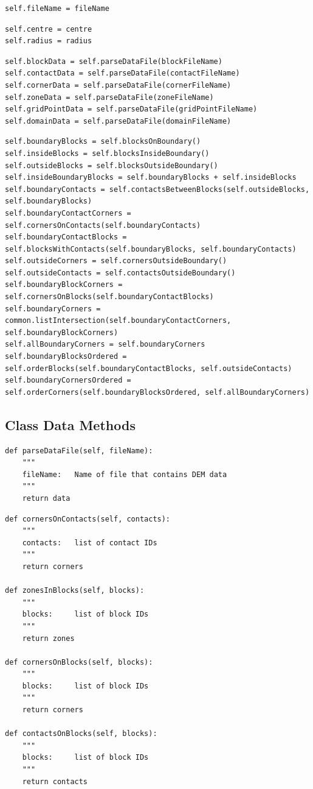 \begin{lstlisting}[frame=single] 
self.fileName = fileName
\end{lstlisting}


\begin{lstlisting}[frame=single] 
self.centre = centre
self.radius = radius
\end{lstlisting}


\begin{lstlisting}[frame=single] 
self.blockData = self.parseDataFile(blockFileName)
self.contactData = self.parseDataFile(contactFileName)
self.cornerData = self.parseDataFile(cornerFileName)
self.zoneData = self.parseDataFile(zoneFileName)
self.gridPointData = self.parseDataFile(gridPointFileName)
self.domainData = self.parseDataFile(domainFileName)
\end{lstlisting}


\begin{lstlisting}[frame=single] 
self.boundaryBlocks = self.blocksOnBoundary()
self.insideBlocks = self.blocksInsideBoundary()
self.outsideBlocks = self.blocksOutsideBoundary()
self.insideBoundaryBlocks = self.boundaryBlocks + self.insideBlocks
self.boundaryContacts = self.contactsBetweenBlocks(self.outsideBlocks, self.boundaryBlocks)
self.boundaryContactCorners = self.cornersOnContacts(self.boundaryContacts)
self.boundaryContactBlocks = self.blocksWithContacts(self.boundaryBlocks, self.boundaryContacts)
self.outsideCorners = self.cornersOutsideBoundary()
self.outsideContacts = self.contactsOutsideBoundary()
self.boundaryBlockCorners = self.cornersOnBlocks(self.boundaryContactBlocks)
self.boundaryCorners = common.listIntersection(self.boundaryContactCorners, self.boundaryBlockCorners)
self.allBoundaryCorners = self.boundaryCorners
self.boundaryBlocksOrdered = self.orderBlocks(self.boundaryContactBlocks, self.outsideContacts)
self.boundaryCornersOrdered = self.orderCorners(self.boundaryBlocksOrdered, self.allBoundaryCorners)
\end{lstlisting}

\subsection{Class Data Methods}

\begin{lstlisting}[frame=single] 
def parseDataFile(self, fileName):
	"""
	fileName:	Name of file that contains DEM data
	"""
	return data
\end{lstlisting}

\begin{lstlisting}[frame=single] 
def cornersOnContacts(self, contacts):
	"""
	contacts:	list of contact IDs
	"""
	return corners

def zonesInBlocks(self, blocks):
	"""
	blocks:		list of block IDs
	"""
	return zones

def cornersOnBlocks(self, blocks):
	"""
	blocks:		list of block IDs
	"""
	return corners

def contactsOnBlocks(self, blocks):
	"""
	blocks:		list of block IDs
	"""
	return contacts
\end{lstlisting}

